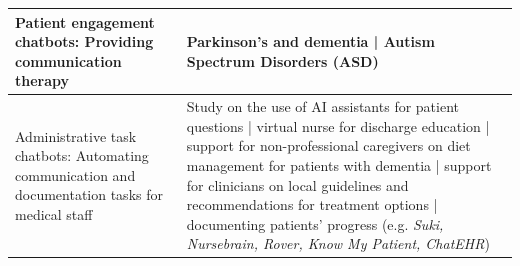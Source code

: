 \begin{table}
\begin{center}
\begin{tabular}{ | m{6cm} | m{8cm} | }
\hline 
Patient engagement chatbots: Providing communication therapy & Parkinson's and dementia \cite{harlie2016, dementiatherapy2020, dementiatherapy2019} | Autism Spectrum Disorders (ASD) \cite{ecaforautism2017} \\ 
\hline 
Administrative task chatbots: Automating communication and documentation tasks for medical staff & Study on the use of AI assistants for patient questions \cite{ayersetall2023redditempathy} | virtual nurse for discharge education \cite{bickmoreetalrealtionalfordepression2010} | support for non-professional caregivers on diet management for patients with dementia \cite{dietforAD2020} | support for clinicians on local guidelines and recommendations for treatment options \cite{korom2024} | documenting patients' progress (e.g. \textit{Suki, Nursebrain, Rover, Know My Patient, ChatEHR})\\
\hline

\end{tabular}
\end{center}
\end{table}


